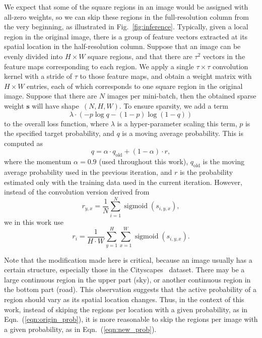 \documentclass[10pt,twocolumn,letterpaper]{article}
\begin{document}
We expect that some of the square regions in an image would be assigned with all-zero weights,
so we can skip these regions in the full-resolution column from the very beginning,
as illustrated in Fig.~\ref{fig:inference}.
Typically, given a local region in the original image,
there is a group of feature vectors extracted at its spatial location in the half-resolution column.
Suppose that an image can be evenly divided into $H \times W$ square regions,
and that there are $\tau^2$ vectors in the feature maps corresponding to each region.
We apply a single $\tau\times\tau$ convolution kernel with a stride of $\tau$ to those feature maps,
and obtain a weight matrix with $H \times W$ entries,
each of which corresponds to one square region in the original image.
Suppose that there are $N$ images per mini-batch,
then the obtained sparse weight $\boldsymbol{s}$ will have shape~$(N, H, W)$.
To ensure sparsity, we add a term~\cite{TrainRBM.2010.Hinton}
\begin{equation}
\lambda \cdot ( -p \log q - (1 - p) \log (1 - q) )
\end{equation}
to the overall loss function,
where $\lambda$ is a hyper-parameter scaling this term,
$p$ is the specified target probability,
and $q$ is a moving average probability.
This is computed as~\cite{TrainRBM.2010.Hinton}
\begin{equation}
q = \alpha \cdot q_{\textrm{old}} + (1 - \alpha) \cdot r,
\end{equation}
where the momentum $\alpha = 0.9$ (used throughout this work),
$q_{\textrm{old}}$ is the moving average probability used in the previous iteration,
and $r$ is the probability estimated only with the training data used in the current iteration.
However, instead of the convolution version derived from~\cite{TrainRBM.2010.Hinton}
\begin{equation}\label{eqn:origin_prob}
r_{y, x} = \frac{1}{N} \sum_{i=1}^{N} \operatorname{sigmoid}(s_{i, y, x}),
\end{equation}
we in this work use
\begin{equation}\label{eqn:new_prob}
r_{i} = \frac{1}{H \cdot W} \sum_{y=1}^{H} \sum_{x=1}^{W} \operatorname{sigmoid}(s_{i, y, x}).
\end{equation}

Note that the modification made here is critical,
because an image usually has a certain structure, especially  those in the Cityscapes~\cite{Cityscapes.CVPR.2016.Cordts} dataset.
There may be a large continuous region in the upper part (sky),
or another continuous region in the bottom part (road).
This observation suggests that the active probability of a region should vary as its spatial location changes.
Thus, in the context of this work,
instead of skiping the regions per location with a given probability, as in Eqn.~(\ref{eqn:origin_prob}),
it is more reasonable to skip the regions per image with a given probability, as in Eqn.~(\ref{eqn:new_prob}).
\end{document}
